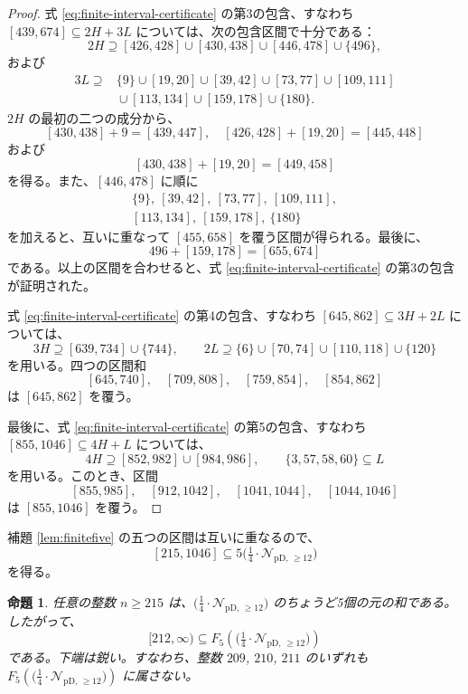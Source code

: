 \documentclass[12pt]{ltjsarticle}
\theoremstyle{plain}
\newtheorem{proposition}[theorem]{命題}
\newcommand{\Pset}{\bigl(\tfrac14\cdot
  \mathcal{N}_{\mathrm{pD},\,\geq12}\bigr)}
\begin{document}
\begin{proof}
式 \eqref{eq:finite-interval-certificate} の第3の包含、すなわち
$[439,674]\subseteq2H+3L$ については、次の包含区間で十分である：
\[
 2H\supseteq[426,428]\cup[430,438]\cup[446,478]\cup\{496\},
\]
および
\[
\begin{split}
3L\supseteq{}&\{9\}\cup[19,20]\cup[39,42]\cup[73,77]
 \cup[109,111]\\
 &{}\cup[113,134]\cup[159,178]\cup\{180\}.
\end{split}
\]
$2H$ の最初の二つの成分から、
\[
 [430,438]+9=[439,447],\quad
 [426,428]+[19,20]=[445,448]
\]
および
\[
 [430,438]+[19,20]=[449,458]
\]
を得る。また、$[446,478]$ に順に
\[
\begin{gathered}
 \{9\},\ [39,42],\ [73,77],\ [109,111],\\
 [113,134],\ [159,178],\ \{180\}
\end{gathered}
\]
を加えると、互いに重なって $[455,658]$ を覆う区間が得られる。最後に、
\[
 496+[159,178]=[655,674]
\]
である。以上の区間を合わせると、式
\eqref{eq:finite-interval-certificate} の第3の包含が証明された。

式 \eqref{eq:finite-interval-certificate} の第4の包含、すなわち
$[645,862]\subseteq3H+2L$ については、
\[
 3H\supseteq[639,734]\cup\{744\},\qquad
 2L\supseteq\{6\}\cup[70,74]\cup[110,118]\cup\{120\}
\]
を用いる。四つの区間和
\[
 [645,740],\quad[709,808],\quad[759,854],\quad[854,862]
\]
は $[645,862]$ を覆う。

最後に、式 \eqref{eq:finite-interval-certificate} の第5の包含、すなわち
$[855,1046]\subseteq4H+L$ については、
\[
 4H\supseteq[852,982]\cup[984,986],
 \qquad \{3,57,58,60\}\subseteq L
\]
を用いる。このとき、区間
\[
 [855,985],\quad[912,1042],\quad[1041,1044],\quad[1044,1046]
\]
は $[855,1046]$ を覆う。
\end{proof}

補題 \ref{lem:finitefive} の五つの区間は互いに重なるので、
\[
 [215,1046]\subseteq5\Pset
\]
を得る。

\begin{proposition}\label{prop:fiveP}
任意の整数 $n\geq215$ は、$\Pset$ のちょうど5個の元の和である。したがって、
\[
 [212,\infty)\subseteq F_5(\Pset)
\]
である。下端は鋭い。すなわち、整数 $209$, $210$, $211$ のいずれも
$F_5(\Pset)$ に属さない。
\end{proposition}
\end{document}
